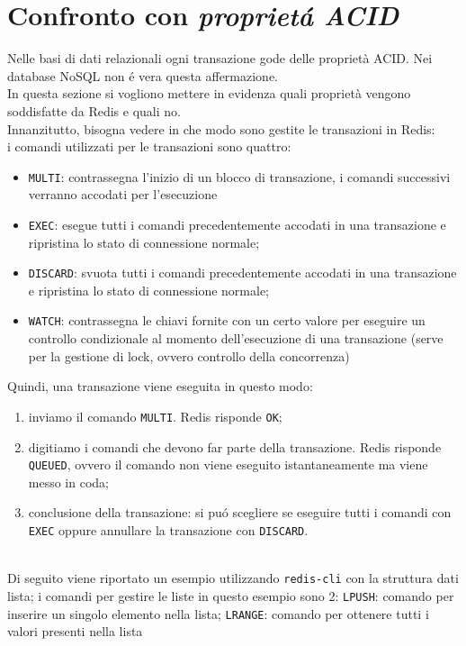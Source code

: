 \section{Confronto con \emph{proprietá ACID}}
Nelle basi di dati relazionali ogni transazione gode delle proprietà ACID. Nei database NoSQL non é vera questa affermazione.\\
In questa sezione si vogliono mettere in evidenza quali proprietà vengono soddisfatte da Redis e quali no.
\\
Innanzitutto, bisogna vedere in che modo sono gestite le transazioni in Redis:\\
i comandi utilizzati per le transazioni sono quattro:
\begin{itemize}
    \item \texttt{MULTI}: contrassegna l'inizio di un blocco di transazione, i comandi successivi verranno accodati per l'esecuzione
    \item \texttt{EXEC}: esegue tutti i comandi precedentemente accodati in una transazione e ripristina lo stato di connessione normale;
    \item \texttt{DISCARD}: svuota tutti i comandi precedentemente accodati in una transazione e ripristina lo stato di connessione normale;
    \item \texttt{WATCH}: contrassegna le chiavi fornite con un certo valore per eseguire un controllo condizionale al momento dell'esecuzione
    di una transazione (serve per la gestione di lock, ovvero controllo della concorrenza)
\end{itemize}

Quindi, una transazione viene eseguita in questo modo:
\begin{enumerate}
    \item inviamo il comando \texttt{MULTI}. Redis risponde \texttt{OK};
    \item digitiamo i comandi che devono far parte della transazione. Redis risponde \texttt{QUEUED}, ovvero il comando non viene eseguito
    istantaneamente ma viene messo in coda;
    \item conclusione della transazione: si puó scegliere se eseguire tutti i comandi con \texttt{EXEC} oppure annullare la transazione
    con \texttt{DISCARD}.
\end{enumerate}
\\
Di seguito viene riportato un esempio utilizzando \texttt{redis-cli} con la struttura dati lista; i comandi per gestire le liste in questo esempio
sono 2: \texttt{LPUSH}: comando per inserire un singolo elemento nella lista; \texttt{LRANGE}: comando per ottenere tutti i valori presenti nella lista


